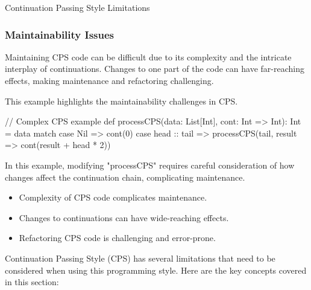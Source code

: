 \begin{notes}{Continuation Passing Style Limitations}
\begin{highlight}
    \end{highlight}
    
    \subsubsection*{Maintainability Issues}
    
    Maintaining CPS code can be difficult due to its complexity and the intricate interplay of continuations. Changes to one part of the code can have far-reaching effects, making maintenance and 
    refactoring challenging.
    
    \begin{highlight}
    
        This example highlights the maintainability challenges in CPS.
    
    \begin{code}[Scala]
    // Complex CPS example
    def processCPS(data: List[Int], cont: Int => Int): Int =
        data match {
            case Nil => cont(0)
            case head :: tail =>
                processCPS(tail, result => cont(result + head * 2))
        }
    \end{code}
    
        In this example, modifying "processCPS" requires careful consideration of how changes affect the continuation chain, complicating maintenance.
    
        \begin{itemize}
            \item Complexity of CPS code complicates maintenance.
            \item Changes to continuations can have wide-reaching effects.
            \item Refactoring CPS code is challenging and error-prone.
        \end{itemize}
    
    \end{highlight}
    
    \begin{highlight}
    
        Continuation Passing Style (CPS) has several limitations that need to be considered when using this programming style. Here are the key concepts covered in this section:
    

\end{highlight}
\end{notes}
